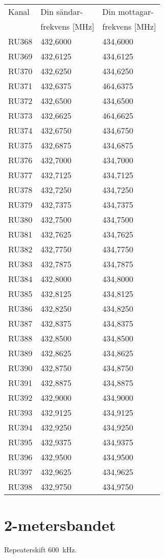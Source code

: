 \begin{tabular}{ l | l | l }
  Kanal & Din sändar- & Din mottagar- \\
        & frekvens [MHz] & frekvens [MHz] \\
  \hline
  RU368 & 432,6000 & 434,6000\\
  RU369 & 432,6125 & 434,6125\\
  RU370 & 432,6250 & 434,6250\\
  RU371 & 432,6375 & 464,6375\\
  RU372 & 432,6500 & 434,6500\\
  RU373 & 432,6625 & 464,6625\\
  RU374 & 432,6750 & 434,6750\\
  RU375 & 432,6875 & 434,6875\\
  RU376 & 432,7000 & 434,7000\\
  RU377 & 432,7125 & 434,7125\\
  RU378 & 432,7250 & 434,7250\\
  RU379 & 432,7375 & 434,7375\\
  RU380 & 432,7500 & 434,7500\\
  RU381 & 432,7625 & 434,7625\\
  RU382 & 432,7750 & 434,7750\\
  RU383 & 432,7875 & 434,7875\\
  RU384 & 432,8000 & 434,8000\\
  RU385 & 432,8125 & 434,8125\\
  RU386 & 432,8250 & 434,8250\\
  RU387 & 432,8375 & 434,8375\\
  RU388 & 432,8500 & 434,8500\\
  RU389 & 432,8625 & 434,8625\\
  RU390 & 432,8750 & 434,8750\\
  RU391 & 432,8875 & 434,8875\\
  RU392 & 432,9000 & 434,9000\\
  RU393 & 432,9125 & 434,9125\\
  RU394 & 432,9250 & 434,9250\\
  RU395 & 432,9375 & 434,9375\\
  RU396 & 432,9500 & 434,9500\\
  RU397 & 432,9625 & 434,9625\\
  RU398 & 432,9750 & 434,9750\\
\end{tabular}

\section{2-metersbandet}
Repeaterskift 600~kHz.


